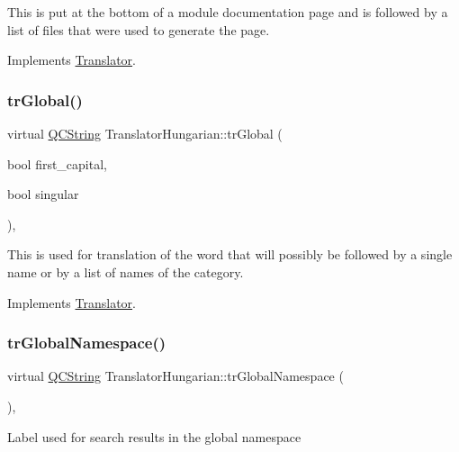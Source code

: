 This is put at the bottom of a module documentation page and is followed by a list of files that were used to generate the page. 

Implements \mbox{\hyperlink{class_translator}{Translator}}.

\mbox{\label{class_translator_hungarian_a629515c0d6f18c4991eee07f7b0b2be3}} 
\subsubsection{\texorpdfstring{trGlobal()}{trGlobal()}}
{\footnotesize\ttfamily virtual \mbox{\hyperlink{class_q_c_string}{Q\+C\+String}} Translator\+Hungarian\+::tr\+Global (\begin{DoxyParamCaption}\item[{bool}]{first\+\_\+capital,  }\item[{bool}]{singular }\end{DoxyParamCaption})\hspace{0.3cm}{\ttfamily [inline]}, {\ttfamily [virtual]}}

This is used for translation of the word that will possibly be followed by a single name or by a list of names of the category. 

Implements \mbox{\hyperlink{class_translator}{Translator}}.

\mbox{\label{class_translator_hungarian_a81d42a47bd47864c2b83415be381af5f}} 
\subsubsection{\texorpdfstring{trGlobalNamespace()}{trGlobalNamespace()}}
{\footnotesize\ttfamily virtual \mbox{\hyperlink{class_q_c_string}{Q\+C\+String}} Translator\+Hungarian\+::tr\+Global\+Namespace (\begin{DoxyParamCaption}{ }\end{DoxyParamCaption})\hspace{0.3cm}{\ttfamily [inline]}, {\ttfamily [virtual]}}

Label used for search results in the global namespace 

